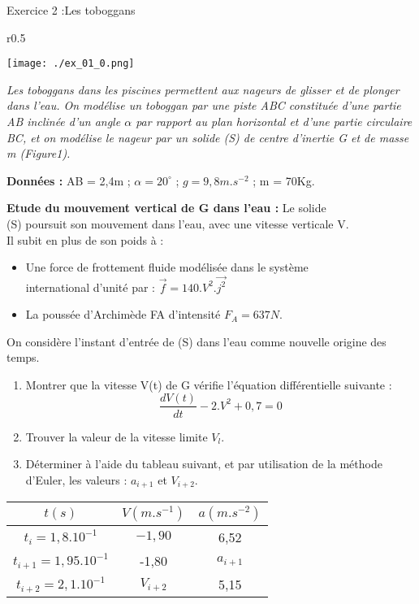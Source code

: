 \documentclass[12pt, french]{article}
\begin{document}
\begin{Box2}{Exercice 2 :Les toboggans }
	\begin{wrapfigure}[6]{r}{0.5\textwidth}
  \begin{center}
	  \vspace{-0.6cm}
	\texttt{[image: ./ex\_01\_0.png]}
  \end{center}
\end{wrapfigure}

	\emph{Les toboggans dans les piscines permettent aux nageurs de glisser et de plonger
dans l’eau.
On modélise un toboggan par une piste ABC constituée d’une partie AB inclinée
d’un angle $\alpha$ par rapport au plan horizontal et d’une partie circulaire BC, et on
modélise le nageur par un solide (S) de centre d’inertie G et de masse m (Figure1).}

\textbf{Données :} AB = 2,4m ; $\alpha = 20^{\circ}$ ; $ g= 9,8m.s^{-2}$ ; m = 70Kg.

\textbf{Etude du mouvement vertical de G dans l’eau :}
Le solide \\(S) poursuit son mouvement dans
l’eau, avec une vitesse verticale V.\\ Il subit
en plus de son poids à :

\begin{itemize}
	\item Une force de frottement fluide
modélisée dans le système
\\international d’unité par : $\vec{f} =140.V^2.\vec{j^2}$

\item La poussée d’Archimède FA d’intensité $F_A = 637 N$.

\end{itemize}
On considère l’instant d’entrée de (S) dans l’eau comme nouvelle origine des temps.

\begin{enumerate}
	\item Montrer que la vitesse V(t) de G vérifie l’équation différentielle suivante : $$\frac{dV(t)}{dt}-2.V^2 + 0,7 = 0$$

	\item Trouver la valeur de la vitesse limite $V_l$.
	\item Déterminer à l’aide du tableau suivant, et par utilisation de la méthode
		d’Euler, les valeurs : $a_{i+1}$ et $V_{i+2}$.
\end{enumerate}

\begin{center}
\begin{tabular}{ |c|c|c| } 
 \hline
 $t(s)$		& $V(m.s^{-1})$	 & $a(m.s^{-2})$ \\\hline
 $t_i = 1,8.10^{-1}$		& $-1,90$		& 6,52 \\\hline 
 $t_{i+1}= 1,95.10^{-1}$	& -1,80	& $a_{i+1}$ \\\hline  
 $t_{i+2}= 2,1.10^{-1}$	& $V_{i+2}$	& 5,15 \\\hline  
 \hline
\end{tabular}
\end{center}
\end{Box2}
\end{document}
